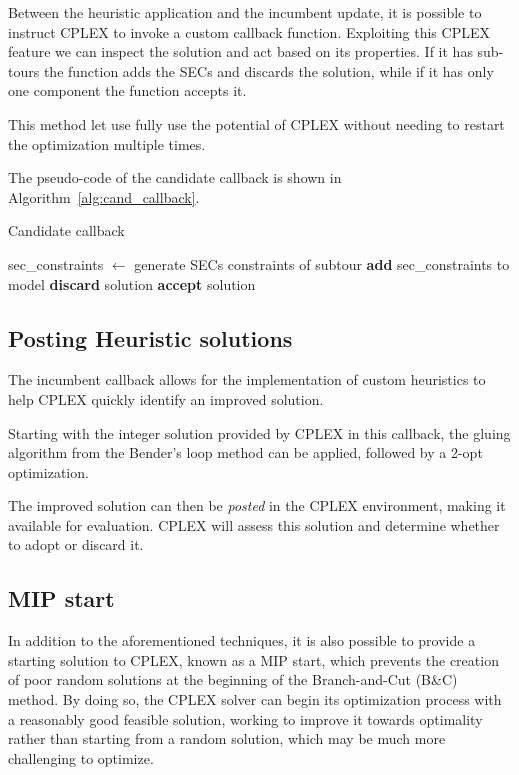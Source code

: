 Between the heuristic application and the incumbent update, it is possible to instruct CPLEX to invoke a custom callback function. Exploiting this CPLEX feature we can inspect the solution and act based on its properties. If it has sub-tours the function adds the SECs and discards the solution, while if it has only one component the function accepts it.

This method let use fully use the potential of CPLEX without needing to restart the optimization multiple times.

The pseudo-code of the candidate callback is shown in Algorithm~\ref{alg:cand_callback}.\\

\begin{algorithm}[H]
    \caption{Candidate callback}
    \label{alg:cand_callback}
    \begin{spacing}{1.2} %
        \BlankLine
        {
            {
                sec\_constraints $\leftarrow$ generate SECs constraints of subtour\;
                \textbf{add} sec\_constraints to model\;
                \textbf{discard} solution\;
            }
        }
        \Else
        {
            \textbf{accept} solution\;
        }
        \BlankLine
    \end{spacing}
\end{algorithm}

\newpage

\subsection{Posting Heuristic solutions}
The incumbent callback allows for the implementation of custom heuristics to help CPLEX quickly identify an improved solution.

Starting with the integer solution provided by CPLEX in this callback, the gluing algorithm from the Bender's loop method can be applied, followed by a 2-opt optimization.

The improved solution can then be \textit{posted} in the CPLEX environment, making it available for evaluation. CPLEX will assess this solution and determine whether to adopt or discard it.

\subsection{MIP start}
In addition to the aforementioned techniques, it is also possible to provide a starting solution to CPLEX, known as a MIP start, which prevents the creation of poor random solutions at the beginning of the Branch-and-Cut (B\&C) method. By doing so, the CPLEX solver can begin its optimization process with a reasonably good feasible solution, working to improve it towards optimality rather than starting from a random solution, which may be much more challenging to optimize.

